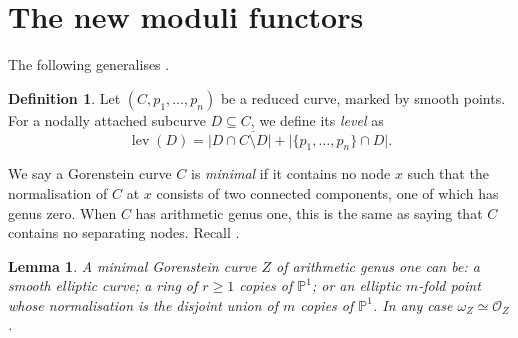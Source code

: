 \documentclass[11pt]{amsart}
\newcommand{\PP}{\mathbb P}
\newcommand{\OO}{\mathcal O}
\newcommand{\lev}{\operatorname{lev}}
\theoremstyle{plain}
\newtheorem{lem}[thm]{Lemma}
\theoremstyle{definition}
\newtheorem{dfn}[thm]{Definition}
\begin{document}
\section{The new moduli functors}\label{sec:stability}
The following generalises \cite[Definition 3.4]{SMY1}.
\begin{dfn}
 Let $(C,p_1,\ldots,p_n)$ be a reduced curve, marked by smooth points. For a nodally attached subcurve $D\subseteq C$, we define its \emph{level} as \[ \lev(D)=\lvert D\cap\overline{C\setminus D}\rvert+\lvert\{p_1,\ldots,p_n\}\cap D\rvert.\]
\end{dfn}
We say a Gorenstein curve $C$ is \emph{minimal} if it contains no node $x$ such that the normalisation of $C$ at $x$ consists of two connected components, one of which has genus zero. When $C$ has arithmetic genus one, this is the same as saying that $C$ contains no separating nodes. Recall \cite[Lemma 3.3]{SMY1}.

\begin{lem}\label{lem:min1}
 A minimal Gorenstein curve $Z$ of arithmetic genus one can be: a smooth elliptic curve; a ring of $r\geq 1$ copies of $\PP^1$; or an elliptic $m$-fold point whose normalisation is the disjoint union of $m$ copies of $\PP^1$. In any case $\omega_Z\simeq\OO_Z$.
\end{lem}
\end{document}
